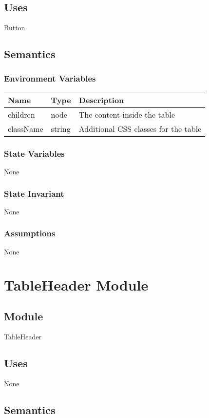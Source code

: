 \documentclass[12pt]{article}
\begin{document}
\subsection{Uses}
Button

\subsection{Semantics}

\subsubsection{Environment Variables}
\begin{tabular}{| l | l | p{10cm} |}
    \hline
    \textbf{Name} & \textbf{Type} & \textbf{Description}\\ \hline
    children & node & The content inside the table\\ \hline
    className & string & Additional CSS classes for the table\\ \hline
\end{tabular}

\subsubsection{State Variables}
None

\subsubsection{State Invariant}
None

\subsubsection{Assumptions}
None

\newpage

\section{TableHeader Module}

\subsection{Module}
TableHeader

\subsection{Uses}
None

\subsection{Semantics}
\end{document}

